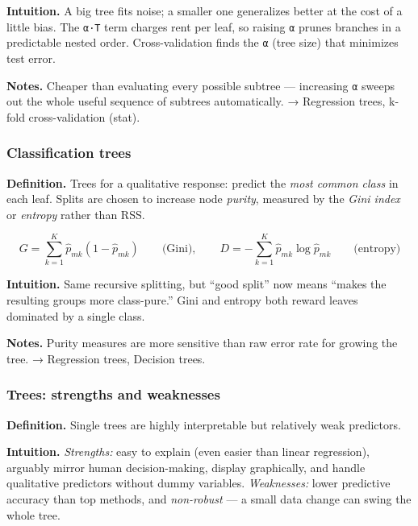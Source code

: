 \documentclass[
  10pt,
  letterpaper,
  onecolumn]{article}
\begin{document}
\textbf{Intuition.} A big tree fits noise; a smaller one generalizes
better at the cost of a little bias. The
\texttt{α·\textbar{}T\textbar{}} term charges rent per leaf, so raising
\texttt{α} prunes branches in a predictable nested order.
Cross-validation finds the \texttt{α} (tree size) that minimizes test
error.

\textbf{Notes.} Cheaper than evaluating every possible subtree ---
increasing \texttt{α} sweeps out the whole useful sequence of subtrees
automatically. → Regression trees, k-fold cross-validation (stat).

\hypertarget{classification-trees}{%
\subsubsection{Classification trees}\label{classification-trees}}

\textbf{Definition.} Trees for a qualitative response: predict the
\emph{most common class} in each leaf. Splits are chosen to increase
node \emph{purity}, measured by the \emph{Gini index} or \emph{entropy}
rather than RSS.

\begin{equation*}
G=\sum_{k=1}^{K}\hat p_{mk}(1-\hat p_{mk})
\qquad\text{(Gini)},
\qquad
D=-\sum_{k=1}^{K}\hat p_{mk}\log \hat p_{mk}
\qquad\text{(entropy)}
\end{equation*}

\textbf{Intuition.} Same recursive splitting, but ``good split'' now
means ``makes the resulting groups more class-pure.'' Gini and entropy
both reward leaves dominated by a single class.

\textbf{Notes.} Purity measures are more sensitive than raw error rate
for growing the tree. → Regression trees, Decision trees.

\hypertarget{trees-strengths-and-weaknesses}{%
\subsubsection{Trees: strengths and
weaknesses}\label{trees-strengths-and-weaknesses}}

\textbf{Definition.} Single trees are highly interpretable but
relatively weak predictors.

\textbf{Intuition.} \emph{Strengths:} easy to explain (even easier than
linear regression), arguably mirror human decision-making, display
graphically, and handle qualitative predictors without dummy variables.
\emph{Weaknesses:} lower predictive accuracy than top methods, and
\emph{non-robust} --- a small data change can swing the whole tree.
\end{document}
